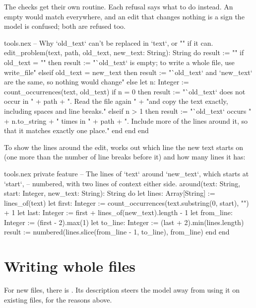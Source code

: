 The checks get their own routine. Each refusal says what to do instead.
An empty  would match everywhere, and an edit that changes
nothing is a sign the model is confused; both are refused too.

\begin{continued}{tools.nex}
  -- Why `old_text` can't be replaced in `text`, or "" if it can.
  edit_problem(text, path, old_text, new_text: String): String do
    result := ""
    if old_text = "" then
      result := "`old_text` is empty; to write a whole file, use write_file"
    elseif old_text = new_text then
      result := "`old_text` and `new_text` are the same, so nothing would change"
    else
      let n: Integer := count_occurrences(text, old_text)
      if n = 0 then
        result := "`old_text` does not occur in " + path + ". Read the file again "
          + "and copy the text exactly, including spaces and line breaks."
      elseif n > 1 then
        result := "`old_text` occurs " + n.to_string + " times in " + path
          + ". Include more of the lines around it, so that it matches exactly one place."
      end
    end
  end
\end{continued}

To show the lines around the edit,  works out which line the
new text starts on (one more than the number of line breaks before it)
and how many lines it has:

\begin{continued}{tools.nex}
  private feature
    -- The lines of `text` around `new_text`, which starts at `start`,
    -- numbered, with two lines of context either side.
    around(text: String, start: Integer, new_text: String): String do
      let lines: Array[String] := lines_of(text)
      let first: Integer := count_occurrences(text.substring(0, start), "\n") + 1
      let last: Integer := first + lines_of(new_text).length - 1
      let from_line: Integer := (first - 2).max(1)
      let to_line: Integer := (last + 2).min(lines.length)
      result := numbered(lines.slice(from_line - 1, to_line), from_line)
    end
end
\end{continued}

\section{Writing whole files}

For new files, there is . Its description steers the
model away from using it on existing files, for the reasons above.

